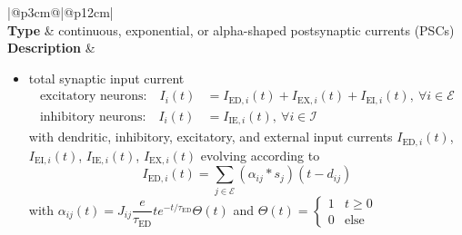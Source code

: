 \documentclass[10pt,a4paper,twoside,american]{article}
\newcommand{\Epop}{\mathcal{E}} %
\newcommand{\Ipop}{\mathcal{I}} %
\begin{document}


\begin{table}[ht!]
  \small
  \begin{tabular}{|@{\hspace*{1mm}}p{3cm}@{}|@{\hspace*{1mm}}p{12cm}|}
  \hline
  \\
  \hline
  \textbf{Type} & continuous, exponential, or alpha-shaped postsynaptic currents (PSCs) \\
  \hline
  \textbf{Description} &                 
    \begin{itemize}
      \item  total synaptic input current
      \begin{equation}
        \label{eq:all_curr}
        \begin{aligned}
          \text{excitatory neurons:}\quad I_i(t) &= I_{\text{ED},i}(t) + I_{\text{EX},i}(t) + I_{\text{EI},i}(t) ,\ \forall i\in\Epop \\
          \text{inhibitory neurons:}\quad I_i(t) &= I_{\text{IE},i}(t) ,\ \forall i\in\Ipop
        \end{aligned}
      \end{equation}
      with dendritic, inhibitory, excitatory, and external input currents $I_{\text{ED},i}(t)$,  $I_{\text{EI},i}(t)$, $I_{\text{IE},i}(t)$, $I_{\text{EX},i}(t)$ evolving according to
      \begin{equation}
        \label{eq:dendritic_current}
          I_{\text{ED},i}(t)=\sum_{j\in\Epop}(\alpha_{ij}*s_j)(t-d_{ij})
    \end{equation}
    \qquad with $\alpha_{ij}(t)=J_{ij} \dfrac{e}{\tau_{\text{ED}}} t e^{-t/\tau_{\text{ED}}} \Theta(t)$
    and
    $
    \Theta(t)=
    \begin{cases}1 & t \ge 0 \\ 0 & \text{else} \end{cases}
    $
    \begin{equation}

\end{equation}
\end{itemize}
\end{tabular}
\end{table}
\end{document}
